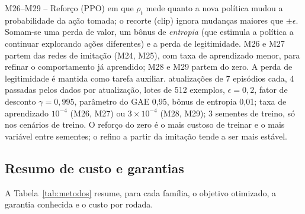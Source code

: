\begin{metodo}{M26--M29 -- Reforço (PPO)}
em que $\rho_t$ mede quanto a nova política mudou a probabilidade da ação tomada; o recorte ($\mathrm{clip}$) ignora
mudanças maiores que $\pm\epsilon$. Somam-se uma perda de valor, um bônus de \emph{entropia} (que estimula a política a
continuar explorando ações diferentes) e a perda de legitimidade.
\adap M26 e M27 partem das redes de imitação (M24, M25), com taxa de aprendizado menor, para refinar o comportamento já
aprendido; M28 e M29 partem do zero. A perda de legitimidade é mantida como tarefa auxiliar.
 atualizações de 7 episódios cada, 4 passadas pelos dados por atualização, lotes de 512 exemplos, $\epsilon=0{,}2$,
fator de desconto $\gamma=0{,}995$, parâmetro do GAE 0,95, bônus de entropia 0,01; taxa de aprendizado $10^{-4}$ (M26, M27)
ou $3\times10^{-4}$ (M28, M29); 3 sementes de treino, só nos cenários de treino.
\espera O reforço do zero é o mais custoso de treinar e o mais variável entre sementes; o refino a partir da imitação
tende a ser mais estável.
\end{metodo}

\subsection{Resumo de custo e garantias}
A Tabela~\ref{tab:metodos} resume, para cada família, o objetivo otimizado, a garantia conhecida e o custo por rodada.

